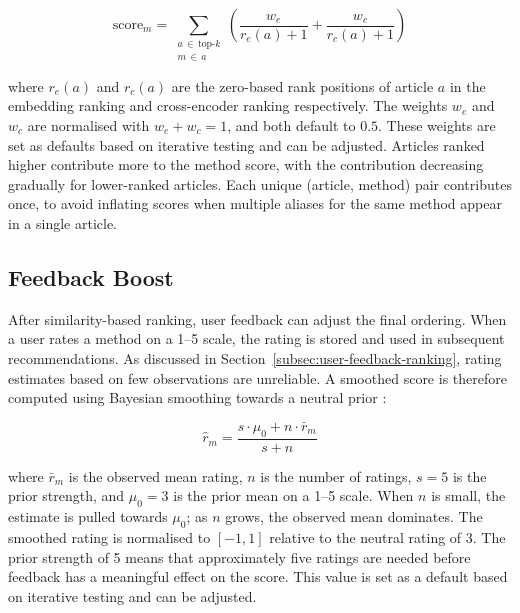 \begin{equation}
    \text{score}_m = \sum_{\substack{a \,\in\, \text{top-}k \\ 
    m \,\in\, a}}
        \left(
            \frac{w_e}{r_e(a) + 1} + \frac{w_c}{r_c(a) + 1}
        \right)
    \label{eq:method-score}
\end{equation}

where $r_e(a)$ and $r_c(a)$ are the zero-based rank positions 
of article $a$ in the embedding ranking and cross-encoder 
ranking respectively. The weights $w_e$ and $w_c$ are 
normalised with $w_e + w_c = 1$, and both default to $0.5$. 
These weights are set as defaults based on iterative testing 
and can be adjusted. Articles ranked higher contribute more 
to the method score, with the contribution decreasing 
gradually for lower-ranked articles. Each unique 
(article, method) pair contributes once, to avoid inflating 
scores when multiple aliases for the same method appear in 
a single article.

\subsection{Feedback Boost}
\label{subsec:feedback-boost}

After similarity-based ranking, user feedback can adjust the 
final ordering. When a user rates a method on a 1--5 scale, 
the rating is stored and used in subsequent recommendations. 
As discussed in Section~\ref{subsec:user-feedback-ranking}, 
rating estimates based on few observations are unreliable. 
A smoothed score is therefore computed using Bayesian smoothing 
towards a neutral prior 
\parencite[Chapter~3.3]{murphy2012machine_learning_probabilistic_perspective}:

\begin{equation}
    \hat{r}_m = \frac{s \cdot \mu_0 + n \cdot \bar{r}_m}{s + n}
    \label{eq:smoothed-rating}
\end{equation}

where $\bar{r}_m$ is the observed mean rating, $n$ is the 
number of ratings, $s = 5$ is the prior strength, and 
$\mu_0 = 3$ is the prior mean on a 1--5 scale. When $n$ is 
small, the estimate is pulled towards $\mu_0$; as $n$ grows, 
the observed mean dominates. The smoothed rating is normalised 
to $[-1, 1]$ relative to the neutral rating of 3. The prior 
strength of 5 means that approximately five ratings are needed 
before feedback has a meaningful effect on the score. This 
value is set as a default based on iterative testing and 
can be adjusted.

